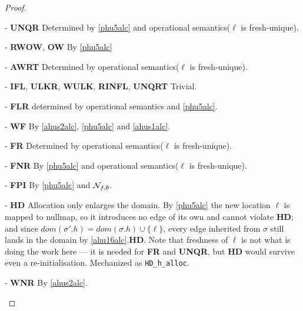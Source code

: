 \begin{proof}
\begin{case} - \textbf{UNQR} Determined by \ref{phu5alc} and operational semantics($\ell$ is fresh-unique).
\end{case}
\begin{case} - \textbf{RWOW}, \textbf{OW} By \ref{phu5alc}
\end{case}
\begin{case} - \textbf{AWRT} Determined by operational semantics($\ell$ is fresh-unique). 
\end{case}
\begin{case} - \textbf{IFL}, \textbf{ULKR}, \textbf{WULK}, \textbf{RINFL}, \textbf{UNQRT} Trivial.
\end{case}
\begin{case} - \textbf{FLR} determined by operational semantics and \ref{phu5alc}.
\end{case}
\begin{case} - \textbf{WF} By \ref{ahus2alc}, \ref{phu5alc} and \ref{ahus1alc}. 
\end{case}
\begin{case} - \textbf{FR} Determined by operational semantics($\ell$ is fresh-unique).
\end{case}
\begin{case} - \textbf{FNR} By \ref{phu5alc} and operational semantics($\ell$ is fresh-unique).
\end{case}
\begin{case} - \textbf{FPI} By \ref{phu5alc} and $\mathcal{N}_{f,\emptyset}$.
\end{case} 
\begin{case} - \textbf{HD}
Allocation only enlarges the domain.  By \ref{phu5alc} the new location $\ell$
is mapped to \textsf{nullmap}, so it introduces no edge of its own and cannot
violate \textbf{HD}; and since $dom(\sigma'.h) = dom(\sigma.h) \cup \{\ell\}$,
every edge inherited from $\sigma$ still lands in the domain by
\ref{ahu16alc}.\textbf{HD}.  Note that freshness of $\ell$ is not what is doing
the work here --- it is needed for \textbf{FR} and \textbf{UNQR}, but
\textbf{HD} would survive even a re-initialisation.  Mechanized as
\texttt{HD\_h\_alloc}.
\end{case}
\begin{case} - \textbf{WNR} By \ref{ahus2alc}.
\end{case}


\end{proof}
